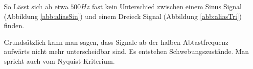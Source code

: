 \documentclass[12pt, a4paper, ngerman]{article}
\begin{document}
So Lässt sich ab etwa $500Hz$ fast kein Unterschied
zwischen einem Sinus Signal (Abbildung \ref{abb:aliasSin})
und einem Dreieck Signal (Abbildung \ref{abb:aliasTri}) finden.

Grundsätzlich kann man sagen,
dass Signale ab der halben Abtastfrequenz aufwärts nicht mehr unterscheidbar sind.
Es entstehen Schwebungszustände. Man spricht auch vom Nyquist-Kriterium.
\end{document}

